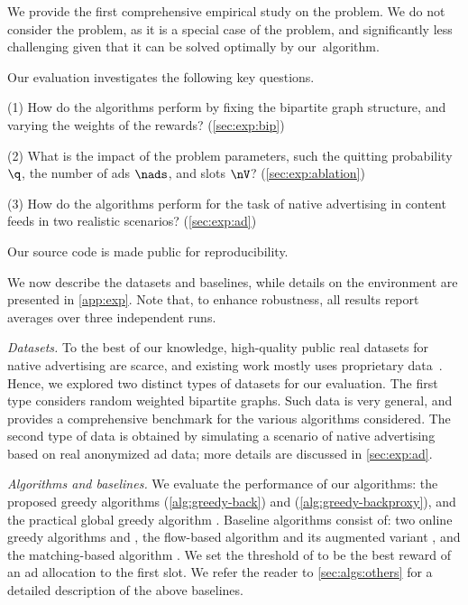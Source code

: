 We provide the first comprehensive empirical study 
on the \streamads problem. 
We do not consider the \streamadsr problem, 
as it is a special case of the \streamads problem, and 
significantly less challenging given that it can be solved optimally by our~\alggback algorithm. %

\noindent
Our evaluation investigates the following key questions.
	
(1) How do the algorithms perform 
	by fixing the bipartite graph structure,
	and varying the weights of the rewards? (\cref{sec:exp:bip})	

(2) What is the impact of the problem parameters, such the quitting probability $\q$, the number of ads $\nads$, and slots $\nV$? (\cref{sec:exp:ablation})

(3) How do the algorithms perform for the task of native advertising in content feeds in two realistic scenarios? (\cref{sec:exp:ad})

Our source code is made public for reproducibility.{\code}



We now describe the datasets and baselines, while details on the environment 
are presented in \cref{app:exp}.
Note that, to enhance robustness, all results report averages over three independent runs.

\smallskip
\noindent
\emph{Datasets.}
To the best of our knowledge, 
high-quality public real datasets for native advertising are scarce, and existing work mostly uses proprietary data~\cite{yan2020ads,carrion2021blending,liao2022cross}.
Hence, we 
explored %
two distinct types of datasets for our evaluation.
The first type considers random weighted bipartite graphs.
Such data is very general, %
and provides a comprehensive benchmark for the various algorithms considered.
The second type of data is obtained by simulating a scenario of native advertising based on real anonymized ad data; more details are discussed in \cref{sec:exp:ad}.


\smallskip
\noindent
\emph{Algorithms and baselines.}
We evaluate the performance of our algorithms:
the proposed greedy algorithms \alggback (\cref{alg:greedy-back}) and \alggbackproxy (\cref{alg:greedy-backproxy}), and the practical global greedy algorithm \alggglobal.
Baseline algorithms consist of:
two online greedy algorithms \alggforward and \alggonline,
the flow-based algorithm {\algflow} and its augmented variant \algflowg, and
the matching-based algorithm \algmwm.
We set the threshold of \alggonline to be the best reward of an ad allocation to the first slot.
We refer the reader to \cref{sec:algs:others} for a detailed description of the above baselines.



